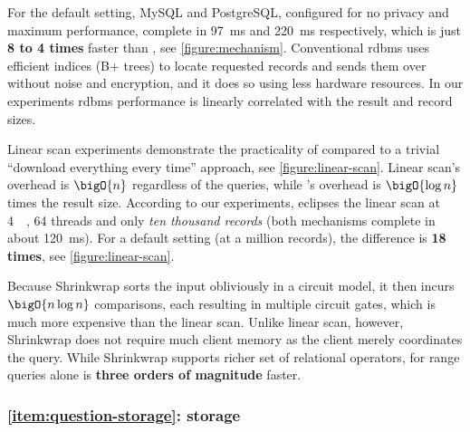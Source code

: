 			For the default setting, MySQL and PostgreSQL, configured for no privacy and maximum performance, complete in \SI{97}{\milli\second} and \SI{220}{\milli\second} respectively, which is just \textbf{8 to 4 times} faster than \epsolute{}, see \cref{figure:mechanism}.
			Conventional \acrshort{rdbms} uses efficient indices (B+ trees) to locate requested records and sends them over without noise and encryption, and it does so using less hardware resources.
			In our experiments \acrshort{rdbms} performance is linearly correlated with the result and record sizes.

			

			Linear scan experiments demonstrate the practicality of \epsolute{} compared to a trivial ``download everything every time'' approach, see \cref{figure:linear-scan}.
			Linear scan's overhead is $\bigO{n}$ regardless of the queries, while \epsolute{}'s overhead is $\bigO{\log{n}}$ times the result size.
			According to our experiments, \epsolute{} eclipses the linear scan at \SI{4}{\kibi\byte}, 64 threads and only \emph{ten thousand records} (both mechanisms complete in about \SI{120}{\milli\second}).
			For a default setting (at a million records), the difference is \textbf{18 times}, see \cref{figure:linear-scan}.

			Because Shrinkwrap sorts the input obliviously in a circuit model, it then incurs $\bigO{n \log n}$ comparisons, each resulting in multiple circuit gates, which is much more expensive than the linear scan.
			Unlike linear scan, however, Shrinkwrap does not require much client memory as the client merely coordinates the query.
			While Shrinkwrap supports richer set of relational operators, for range queries alone \epsolute{} is \textbf{three orders of magnitude} faster.

		\subsubsection*{\textbf{\texorpdfstring{\ref{item:question-storage}:}{} storage}}

			

